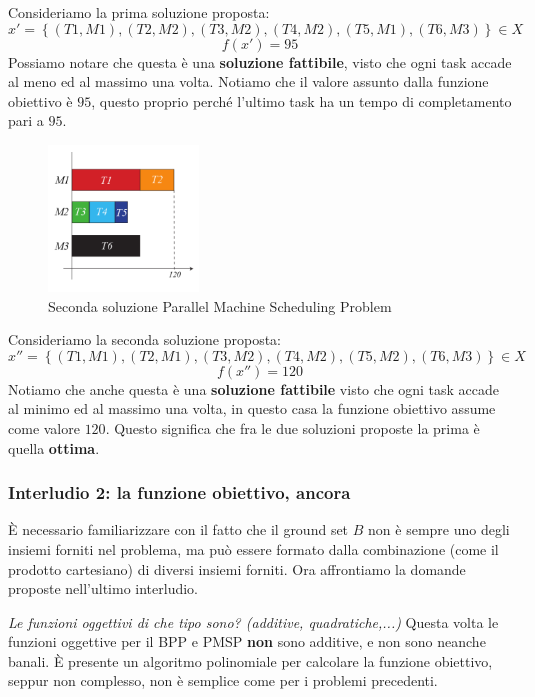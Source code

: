 \documentclass{article}
\begin{document}
Consideriamo la prima soluzione proposta:
$$x'=\left\{(T1,M1),(T2,M2),(T3,M2),(T4,M2),(T5,M1),(T6,M3)\right\}\in X$$
$$f(x')=95$$
Possiamo notare che questa è una \textbf{soluzione fattibile},
visto che ogni task accade al meno ed al massimo una volta.
Notiamo che il valore assunto dalla funzione obiettivo è $95$, questo proprio
perché l'ultimo task ha un tempo di completamento pari a $95$.

\begin{figure}[H]
    \centering
    \includegraphics[width=4cm]{images/sol2_PMSP.png}
    \caption{Seconda soluzione Parallel Machine Scheduling Problem}
    \label{fig:sol2_PMSP}
\end{figure}

Consideriamo la seconda soluzione proposta:
$$x''=\left\{(T1,M1),(T2,M1),(T3,M2),(T4,M2),(T5,M2),(T6,M3)\right\}\in X$$
$$f(x'')=120$$
Notiamo che anche questa è una \textbf{soluzione fattibile} visto che ogni task accade al
minimo ed al massimo una volta, in questo casa la funzione obiettivo assume come valore $120$.
Questo significa che fra le due soluzioni proposte la prima è quella \textbf{ottima}.

\subsubsection{Interludio 2: la funzione obiettivo, ancora}
È necessario familiarizzare con il fatto che il ground set $B$ non è sempre uno degli insiemi
forniti nel problema, ma può essere formato dalla combinazione (come il prodotto cartesiano)
di diversi insiemi forniti. Ora affrontiamo la domande proposte nell'ultimo interludio.

\textit{Le funzioni oggettivi di che tipo sono? (additive, quadratiche,...)}
Questa volta le funzioni oggettive per il BPP e PMSP \textbf{non} sono additive, e non sono neanche banali.
È presente un algoritmo polinomiale per calcolare la funzione obiettivo, seppur non complesso,
non è semplice come per i problemi precedenti.
\end{document}
